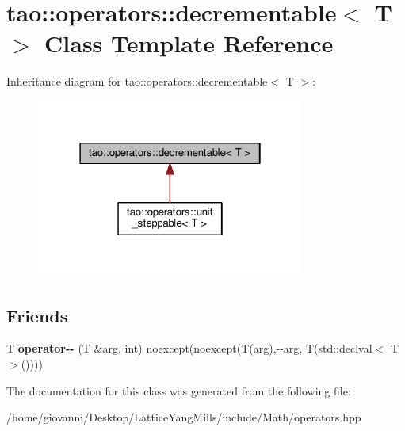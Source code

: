 \hypertarget{classtao_1_1operators_1_1decrementable}{}\section{tao\+:\+:operators\+:\+:decrementable$<$ T $>$ Class Template Reference}
\label{classtao_1_1operators_1_1decrementable}


Inheritance diagram for tao\+:\+:operators\+:\+:decrementable$<$ T $>$\+:\nopagebreak
\begin{figure}[H]
\begin{center}
\leavevmode
\includegraphics[width=250pt]{classtao_1_1operators_1_1decrementable__inherit__graph}
\end{center}
\end{figure}
\subsection*{Friends}
\begin{DoxyCompactItemize}
\item 
T {\bfseries operator-\/-\/} (T \&arg, int) noexcept(noexcept(T(arg),-\/-\/arg, T(std\+::declval$<$ T $>$())))\hypertarget{classtao_1_1operators_1_1decrementable_a5951f2669916dab61b847a77b27a1558}{}\label{classtao_1_1operators_1_1decrementable_a5951f2669916dab61b847a77b27a1558}

\end{DoxyCompactItemize}


The documentation for this class was generated from the following file\+:\begin{DoxyCompactItemize}
\item 
/home/giovanni/\+Desktop/\+Lattice\+Yang\+Mills/include/\+Math/operators.\+hpp\end{DoxyCompactItemize}
